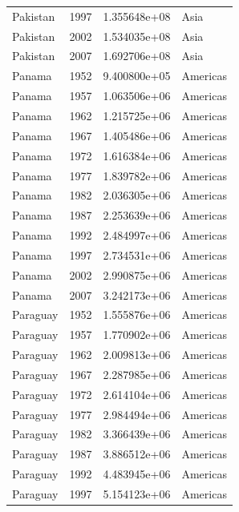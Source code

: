 \documentclass[
  letterpaper,
  DIV=11,
  numbers=noendperiod]{scrreprt}
\begin{document}
\begin{tcolorbox}
\begin{tabular}{lrrl}
Pakistan                 &  1997 &  1.355648e+08 &      Asia \\
Pakistan                 &  2002 &  1.534035e+08 &      Asia \\
Pakistan                 &  2007 &  1.692706e+08 &      Asia \\
Panama                   &  1952 &  9.400800e+05 &  Americas \\
Panama                   &  1957 &  1.063506e+06 &  Americas \\
Panama                   &  1962 &  1.215725e+06 &  Americas \\
Panama                   &  1967 &  1.405486e+06 &  Americas \\
Panama                   &  1972 &  1.616384e+06 &  Americas \\
Panama                   &  1977 &  1.839782e+06 &  Americas \\
Panama                   &  1982 &  2.036305e+06 &  Americas \\
Panama                   &  1987 &  2.253639e+06 &  Americas \\
Panama                   &  1992 &  2.484997e+06 &  Americas \\
Panama                   &  1997 &  2.734531e+06 &  Americas \\
Panama                   &  2002 &  2.990875e+06 &  Americas \\
Panama                   &  2007 &  3.242173e+06 &  Americas \\
Paraguay                 &  1952 &  1.555876e+06 &  Americas \\
Paraguay                 &  1957 &  1.770902e+06 &  Americas \\
Paraguay                 &  1962 &  2.009813e+06 &  Americas \\
Paraguay                 &  1967 &  2.287985e+06 &  Americas \\
Paraguay                 &  1972 &  2.614104e+06 &  Americas \\
Paraguay                 &  1977 &  2.984494e+06 &  Americas \\
Paraguay                 &  1982 &  3.366439e+06 &  Americas \\
Paraguay                 &  1987 &  3.886512e+06 &  Americas \\
Paraguay                 &  1992 &  4.483945e+06 &  Americas \\
Paraguay                 &  1997 &  5.154123e+06 &  Americas \\

\end{tabular}
\end{tcolorbox}
\end{document}
